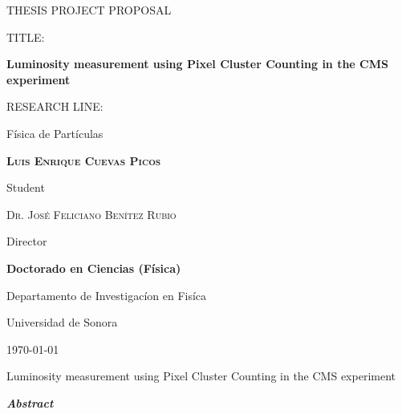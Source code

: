 \documentclass[final,12p]{article}
\def\Student{Luis Enrique Cuevas  Picos}
\def\Title{THESIS PROJECT PROPOSAL}
\def\Prog{Doctorado en Ciencias (F\'{i}sica) }
\def\Dept{Departamento de Investigac\'{i}on en Fis\'{i}ca}
\def\Institution{Universidad de Sonora}
\def\Director{Dr. Jos\'{e} Feliciano Ben\'{i}tez Rubio}
\def\ProjectTitle{Luminosity measurement using Pixel Cluster Counting in the CMS experiment}
\def\ResearchLine{F\'{i}sica de Part\'{i}culas}
\begin{document}
\onehalfspacing

\begin{titlepage}
\centering
\hspace{0pt}
\vfill
{\scshape\Large \Title \par}
  
  \vspace{2cm}
  {
    TITLE:\par
    {\bf \large \ProjectTitle \par}
  }
       
  \vspace{0.5cm}
  {
    RESEARCH LINE: \par
    \ResearchLine \par
  }
        
  \vspace{4cm}
  {\underline{\hspace{8cm}}\par}
  {\bf \scshape \Student \par}
  {Student\par}

  \vspace{1cm}
  {\underline{\hspace{8cm}}\par}
  {\scshape \Director \par}
  {Director\par}

  \vspace{1cm}
  {\bf \Prog \par}
  {\Dept \par}
  {\Institution \par}

  \vspace{4cm}
  {\today}

\hspace{0pt}
\vfill

\end{titlepage}


\shipout\null


\newpage
\hspace{2pt}
\vfill

  \begin{center}
    {\Large \ProjectTitle \par}
    \vspace{1cm}
    {\itshape\textbf{Abstract}\par}
  \end{center}
  
\end{document}
